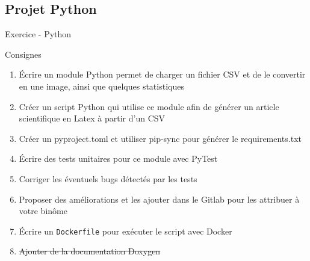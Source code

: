 \documentclass{beamer}
\begin{document}
\subsection{Projet Python}

\begin{frame}[fragile]{Exercice - Python}
\begin{exampleblock}{Consignes}
  \begin{enumerate}
    \item Écrire un module Python permet de charger un fichier CSV et de le convertir en une image, ainsi que quelques statistiques
    \item Créer un script Python qui utilise ce module afin de générer un article scientifique en Latex à partir d'un CSV
    \item Créer un pyproject.toml et utiliser pip-sync pour générer le requirements.txt
    \item Écrire des tests unitaires pour ce module avec PyTest
    \item Corriger les éventuels bugs détectés par les tests
    \item Proposer des améliorations et les ajouter dans le Gitlab pour les attribuer à votre binôme
    \item Écrire un \texttt{Dockerfile} pour exécuter le script avec Docker
    \item \sout{Ajouter de la documentation Doxygen}
  \end{enumerate}
\end{exampleblock}
\end{frame}  
    


\end{document}
